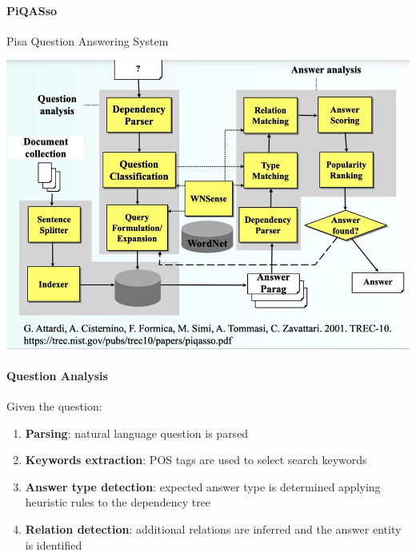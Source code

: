 \documentclass[10pt]{report}
\begin{document}
\paragraph{PiQASso} Pisa Question Answering System
\begin{center}
	\includegraphics[scale=0.5]{96.png}
\end{center}
\paragraph{Question Analysis} Given the question:
\begin{enumerate}
	\item \textbf{Parsing}: natural language question is parsed
	\item \textbf{Keywords extraction}: POS tags are used to select search keywords
	\item \textbf{Answer type detection}: expected answer type is determined applying heuristic rules to the dependency tree
	\item \textbf{Relation detection}: additional relations are inferred and the answer entity is identified
\end{enumerate}
\end{document}
